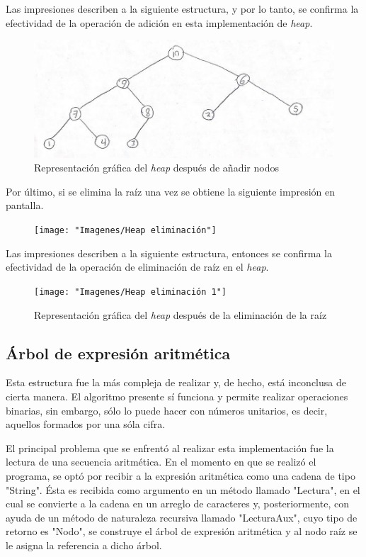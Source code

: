 \documentclass[letterpaper, 11pt]{article}
\begin{document}
	Las impresiones describen a la siguiente estructura, y por lo tanto, se confirma la efectividad de la operación de adición en esta implementación de \textit{heap}.
	
	\begin{figure}[H]
		\centering
		\includegraphics[scale=0.3]{"Imagenes/Heap 2"}
		\caption{Representación gráfica del \textit{heap} después de añadir nodos}
	\end{figure}

	Por último, si se elimina la raíz una vez se obtiene la siguiente impresión en pantalla.
	
	\begin{figure}[H]
		\centering
		\texttt{[image: "Imagenes/Heap eliminación"]}
		\caption{}
	\end{figure}
	
	Las impresiones describen a la siguiente estructura, entonces se confirma la efectividad de la operación de eliminación de raíz en el \textit{heap}.
	
	\begin{figure}[H]
		\centering
		\texttt{[image: "Imagenes/Heap eliminación 1"]}
		\caption{Representación gráfica del \textit{heap} después de la eliminación de la raíz}
	\end{figure}
	
	\subsection*{Árbol de expresión aritmética}
	
	Esta estructura fue la más compleja de realizar y, de hecho, está inconclusa de cierta manera. El algoritmo presente sí funciona y permite realizar operaciones binarias, sin embargo, sólo lo puede hacer con números unitarios, es decir, aquellos formados por una sóla cifra. 
	
	El principal problema que se enfrentó al realizar esta implementación fue la lectura de una secuencia aritmética. En el momento en que se realizó el programa, se optó por recibir a la expresión aritmética como una cadena de tipo "String". Ésta es recibida como argumento en un método llamado "Lectura", en el cual se convierte a la cadena en un arreglo de caracteres y, posteriormente, con ayuda de un método de naturaleza recursiva llamado "LecturaAux", cuyo tipo de retorno es "Nodo", se construye el árbol de expresión aritmética y al nodo raíz se le asigna la referencia a dicho árbol. 
	
\end{document}
